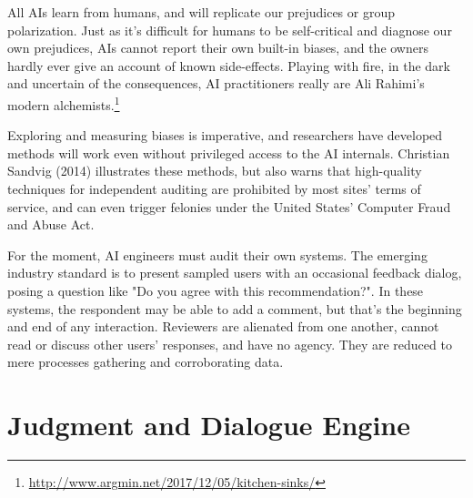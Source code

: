 \documentclass[format=sigconf, authorversion]{acmart}
\begin{document}
All AIs learn from humans, and will replicate our prejudices or group polarization.  Just as it's difficult for humans to be self-critical and diagnose our own prejudices, AIs cannot report their own built-in biases, and the owners hardly ever give an account of known side-effects.  Playing with fire, in the dark and uncertain of the consequences, AI practitioners really are Ali Rahimi's modern alchemists.\footnote{\url{http://www.argmin.net/2017/12/05/kitchen-sinks/}}

Exploring and measuring biases is imperative, and researchers have developed methods will work even without privileged access to the AI internals.  Christian Sandvig (2014) \citep{Sandvig} illustrates these methods, but also warns that high-quality techniques for independent auditing are prohibited by most sites' terms of service, and can even trigger felonies under the United States' Computer Fraud and Abuse Act.

For the moment, AI engineers must audit their own systems.  The emerging industry standard is to present sampled users with an occasional feedback dialog, posing a question like "Do you agree with this recommendation?".  In these systems, the respondent may be able to add a comment, but that's the beginning and end of any interaction.  Reviewers are alienated from one another, cannot read or discuss other users' responses, and have no agency.  They are reduced to mere processes gathering and corroborating data.

\section{Judgment and Dialogue Engine}
\end{document}
